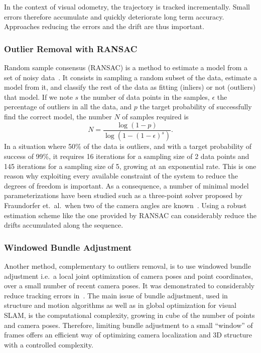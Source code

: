 In the context of visual odometry,
the trajectory is tracked incrementally.
Small errors therefore accumulate
and quickly deteriorate long term accuracy.
Approaches reducing the errors and the drift are thus important.

\subsubsection{Outlier Removal with RANSAC}%
\label{ssub:ransac}

Random sample consensus (RANSAC) is a method to estimate
a model from a set of noisy data~\cite{fischler1981random}.
It consists in sampling a random subset of the data,
estimate a model from it,
and classify the rest of the data as fitting (inliers) or not (outliers) that model.
If we note $s$ the number of data points in the samples,
$\epsilon$ the percentage of outliers in all the data,
and $p$ the target probability of successfully find the correct model,
the number $N$ of samples required is
\[
	N = \frac{\log(1-p)}{\log(1 - (1 - \epsilon)^s)}.
\]
In a situation where 50\% of the data is outliers,
and with a target probability of success of 99\%,
it requires 16 iterations for a sampling size of 2 data points
and 145 iterations for a sampling size of 5,
growing at an exponential rate.
This is one reason why exploiting every available constraint of the system
to reduce the degrees of freedom is important.
As a consequence, a number of minimal model parameterizations
have been studied such as a three-point solver proposed by Fraundorfer et.\ al.\
when two of the camera angles are known~\cite{fraundorfer2010minimal}.
Using a robust estimation scheme like the one provided by RANSAC
can considerably reduce the drifts accumulated along the sequence.


\subsubsection{Windowed Bundle Adjustment}%
\label{ssub:windowed-ba}

Another method, complementary to outliers removal,
is to use windowed bundle adjustment i.e.\ a local joint optimization
of camera poses and point coordinates, over a small number of
recent camera poses.
It was demonstrated to considerably reduce tracking errors in~\cite{konolige2007large}.
The main issue of bundle adjustment, used in structure and motion
algorithms as well as in global optimization for visual SLAM,
is the computational complexity, growing in cube of the number of points
and camera poses.
Therefore, limiting bundle adjustment to a small ``window'' of frames
offers an efficient way of optimizing camera localization and 3D structure
with a controlled complexity.

